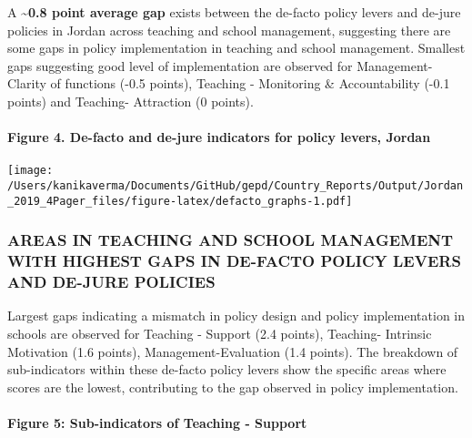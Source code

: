 \documentclass[twocolumn]{article}
\let\oldparagraph\paragraph
\renewcommand{\paragraph}[1]{\oldparagraph{#1}\mbox{}}
\begin{document}
A \textasciitilde{}\textbf{0.8 point average gap} exists between the
de-facto policy levers and de-jure policies in Jordan across teaching
and school management, suggesting there are some gaps in policy
implementation in teaching and school management. Smallest gaps
suggesting good level of implementation are observed for
Management-Clarity of functions (-0.5 points), Teaching - Monitoring \&
Accountability (-0.1 points) and Teaching- Attraction (0 points).

\hypertarget{figure-4.-de-facto-and-de-jure-indicators-for-policy-levers-jordan}{%
\paragraph{Figure 4. De-facto and de-jure indicators for policy levers,
Jordan}\label{figure-4.-de-facto-and-de-jure-indicators-for-policy-levers-jordan}}

\texttt{[image: /Users/kanikaverma/Documents/GitHub/gepd/Country\_Reports/Output/Jordan\_2019\_4Pager\_files/figure-latex/defacto\_graphs-1.pdf]}

\hypertarget{areas-in-teaching-and-school-management-with-highest-gaps-in-de-facto-policy-levers-and-de-jure-policies}{%
\subsubsection{\texorpdfstring{\textbf{AREAS IN TEACHING AND SCHOOL
MANAGEMENT WITH HIGHEST GAPS IN DE-FACTO POLICY LEVERS AND DE-JURE
POLICIES}}{AREAS IN TEACHING AND SCHOOL MANAGEMENT WITH HIGHEST GAPS IN DE-FACTO POLICY LEVERS AND DE-JURE POLICIES}}\label{areas-in-teaching-and-school-management-with-highest-gaps-in-de-facto-policy-levers-and-de-jure-policies}}

Largest gaps indicating a mismatch in policy design and policy
implementation in schools are observed for Teaching - Support (2.4
points), Teaching- Intrinsic Motivation (1.6 points),
Management-Evaluation (1.4 points). The breakdown of sub-indicators
within these de-facto policy levers show the specific areas where scores
are the lowest, contributing to the gap observed in policy
implementation. \vfill\null

\hypertarget{figure-5-sub-indicators-of-teaching---support}{%
\paragraph{Figure 5: Sub-indicators of Teaching -
Support}\label{figure-5-sub-indicators-of-teaching---support}}
\end{document}
